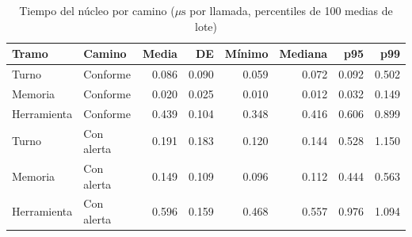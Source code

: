 \begin{table}[!t]
\caption{Tiempo del núcleo por camino ($\mu\mathrm{s}$ por llamada, percentiles de 100 medias de lote)}
\label{tab:latency_bench}
\centering\footnotesize
\begin{tabular*}{\textwidth}{@{\extracolsep{\fill}}llrrrrrr}
\hline
Tramo & Camino & Media & DE & Mínimo & Mediana & p95 & p99\\\hline
Turno & Conforme & 0.086 & 0.090 & 0.059 & 0.072 & 0.092 & 0.502\\
Memoria & Conforme & 0.020 & 0.025 & 0.010 & 0.012 & 0.032 & 0.149\\
Herramienta & Conforme & 0.439 & 0.104 & 0.348 & 0.416 & 0.606 & 0.899\\
Turno & Con alerta & 0.191 & 0.183 & 0.120 & 0.144 & 0.528 & 1.150\\
Memoria & Con alerta & 0.149 & 0.109 & 0.096 & 0.112 & 0.444 & 0.563\\
Herramienta & Con alerta & 0.596 & 0.159 & 0.468 & 0.557 & 0.976 & 1.094\\
\hline
\end{tabular*}
\end{table}
